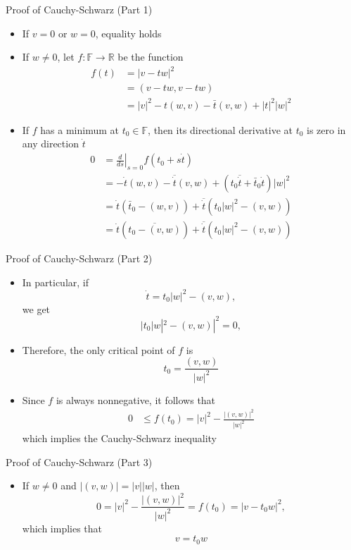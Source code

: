 \documentclass[usenames,dvipsnames,10pt]{beamer}
\newcommand\F{\mathbb{F}}
\newcommand{\R}{\mathbb{R}}
\begin{document}
\begin{frame}
  {Proof of Cauchy-Schwarz (Part 1)}
  \begin{itemize}
  \item If $v = 0$ or $w = 0$, equality holds
  \item If $w \ne 0$, let $f: \F \rightarrow \R$ be the function
    \begin{align*}
      f(t) &= |v-tw|^2\\
           &= (v-tw,v-tw)\\
           &= |v|^2 - t(w,v)-\bar{t}(v,w) + |t|^2|w|^2
    \end{align*}
  \item If $f$ has a minimum at $t_0 \in \F$, then its directional derivative at $t_0$ is zero in any direction $\dot{t}$
    \begin{align*}
      0 &= \left.\frac{d}{ds}\right|_{s=0}f(t_0+s\dot{t})\\
        &= -\dot{t}(w,v)-\overline{\dot{t}}(v,w)+(t_0\overline{\dot{t}}+\bar{t}_0\dot{t})|w|^2\\
        &= \dot{t}(\bar{t}_0-(w,v)) + \overline{\dot{t}}(t_0|w|^2-(v,w))\\
        &= \dot{t}(\overline{t_0-(v,w)}) + \overline{\dot{t}}(t_0|w|^2-(v,w))
    \end{align*}
  \end{itemize}
\end{frame}

\begin{frame}
  {Proof of Cauchy-Schwarz (Part 2)}

  \begin{itemize}
  \item In particular, if
    \[ \dot{t} = t_0|w|^2-(v,w), \]
    we get
    \[
      |t_0|w|^2-(v,w)|^2=0,
    \]
  \item Therefore, the only critical point of $f$ is
    \[
      t_0 = \frac{(v,w)}{|w|^2}
    \]
  \item Since $f$ is always nonnegative, it follows that
    \begin{align*}
      0 &\le f(t_0) = |v|^2 - \frac{|(v,w)|^2}{|w|^2}
    \end{align*}
    which implies the Cauchy-Schwarz inequality
  \end{itemize}
\end{frame}

\begin{frame}
  {Proof of Cauchy-Schwarz (Part 3)}

  \begin{itemize}
  \item If $w \ne 0$ and $|(v,w)| = |v||w|$, then
    \[
      0 = |v|^2-\frac{|(v,w)|^2}{|w|^2} = f(t_0) = |v-t_0w|^2,
    \]
    which implies that
    \[
      v = t_0w
    \]
  \end{itemize}
\end{frame}
\end{document}
